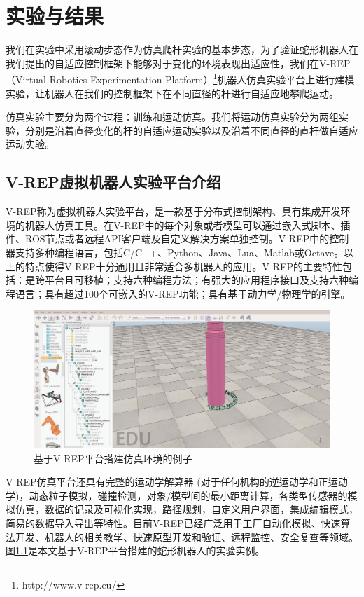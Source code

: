 \chapter{实验与结果}
\label{cha:experiment}
我们在实验中采用滚动步态作为仿真爬杆实验的基本步态，为了验证蛇形机器人在我们提出的自适应控制框架下能够对于变化的环境表现出适应性，我们在V-REP（Virtual Robotics Experimentation Platform）\footnote{http://www.v-rep.eu/}机器人仿真实验平台上进行建模实验，让机器人在我们的控制框架下在不同直径的杆进行自适应地攀爬运动。

仿真实验主要分为两个过程：训练和运动仿真。我们将运动仿真实验分为两组实验，分别是沿着直径变化的杆的自适应运动实验以及沿着不同直径的直杆做自适应运动实验。

\section{V-REP虚拟机器人实验平台介绍}

V-REP称为虚拟机器人实验平台，是一款基于分布式控制架构、具有集成开发环境的机器人仿真工具。在V-REP中的每个对象或者模型可以通过嵌入式脚本、插件、ROS节点或者远程API客户端及自定义解决方案单独控制。V-REP中的控制器支持多种编程语言，包括C/C++、Python、Java、Lua、Matlab或Octave。以上的特点使得V-REP十分通用且非常适合多机器人的应用。V-REP的主要特性包括：是跨平台且可移植；支持六种编程方法；有强大的应用程序接口及支持六种编程语言；具有超过100个可嵌入的V-REP功能；具有基于动力学/物理学的引擎。
\begin{figure}[htbp]
	\centering
	\includegraphics[width=0.9\linewidth]{figure/chap03/snake.eps}
	\caption{基于V-REP平台搭建仿真环境的例子}
	\label{fig:V-REP}
\end{figure}

V-REP仿真平台还具有完整的运动学解算器 (对于任何机构的逆运动学和正运动学)，动态粒子模拟，碰撞检测，对象/模型间的最小距离计算，各类型传感器的模拟仿真，数据的记录及可视化实现，路径规划，自定义用户界面，集成编辑模式，简易的数据导入导出等特性。目前V-REP已经广泛用于工厂自动化模拟、快速算法开发、机器人的相关教学、快速原型开发和验证、远程监控、安全复查等领域。图\ref{fig:V-REP}是本文基于V-REP平台搭建的蛇形机器人的实验实例。



